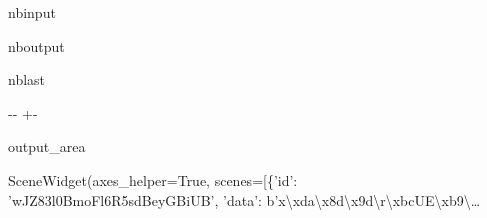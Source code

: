 \documentclass[letterpaper,10pt,english]{sphinxmanual}
\begin{document}
\begin{sphinxuseclass}{nbinput}
{
\begin{sphinxVerbatim}[commandchars=\\\{\}]
\llap{\color{nbsphinxin}[20]:\,\hspace{\fboxrule}\hspace{\fboxsep}}  
              
             
              
\end{sphinxVerbatim}
}

\end{sphinxuseclass}
\begin{sphinxuseclass}{nboutput}
\begin{sphinxuseclass}{nblast}
{

\kern-\sphinxverbatimsmallskipamount\kern-\baselineskip
\kern+\FrameHeightAdjust\kern-\fboxrule
\vspace{\nbsphinxcodecellspacing}

\begin{sphinxuseclass}{output_area}
\begin{sphinxuseclass}{}


\begin{sphinxVerbatim}[commandchars=\\\{\}]
\llap{\color{nbsphinxout}[20]:\,\hspace{\fboxrule}\hspace{\fboxsep}}SceneWidget(axes\_helper=True, scenes=[\{'id': 'wJZ83l0BmoFl6R5sdBeyGBiUB', 'data': b'x\textbackslash{}xda\textbackslash{}x8d\textbackslash{}x9d\textbackslash{}r\textbackslash{}xbcUE\textbackslash{}xb9\textbackslash{}…
\end{sphinxVerbatim}



\end{sphinxuseclass}
\end{sphinxuseclass}
}

\end{sphinxuseclass}
\end{sphinxuseclass}
\end{document}
